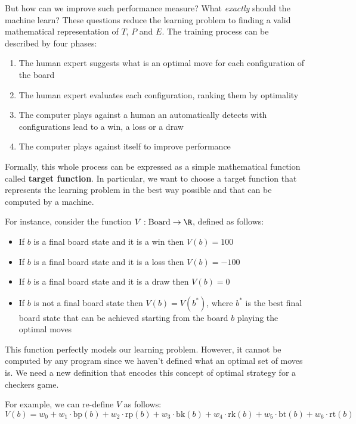 \documentclass[a4paper, 12pt]{report}
\begin{document}
    But how can we improve such performance measure? What \textit{exactly} should the machine learn? These questions reduce the learning problem to finding a valid mathematical representation of $T$, $P$ and $E$.  The training process can be described by four phases:
    \begin{enumerate}
        \item The human expert suggests what is an optimal move for each configuration of the board
        \item The human expert evaluates each configuration, ranking them by optimality
        \item The computer plays against a human an automatically detects with configurations lead to a win, a loss or a draw
        \item The computer plays against itself to improve performance
    \end{enumerate}

    Formally, this whole process can be expressed as a simple mathematical function called \textbf{target function}. In particular, we want to choose a target function that represents the learning problem in the best way possible and that can be computed by a machine.

    For instance, consider the function $V : \mathrm{Board} \to \R$, defined as follows:
    \begin{itemize}
        \item If $b$ is a final board state and it is a win then $V(b) = 100$
        \item If $b$ is a final board state and it is a loss then $V(b) = -100$
        \item If $b$ is a final board state and it is a draw then $V(b) = 0$
        \item If $b$ is not a final board state then $V(b) = V(b^*)$, where $b^*$ is the best final board state that can be achieved starting from the board $b$ playing the optimal moves
    \end{itemize}

    This function perfectly models our learning problem. However, it cannot be computed by any program since we haven't defined what an optimal set of moves is. We need a new definition that encodes this concept of optimal strategy for a checkers game.
    
    For example, we can re-define $V$ as follows:
    \[V(b) = w_0 + w_1 \cdot \mathrm{bp}(b) + w_2 \cdot \mathrm{rp}(b) + w_3 \cdot \mathrm{bk}(b) +w_4 \cdot \mathrm{rk}(b) + w_5 \cdot \mathrm{bt}(b) + w_6 \cdot \mathrm{rt}(b)\]
\end{document}
